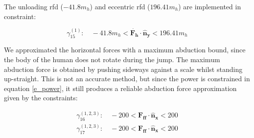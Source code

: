 \documentclass[default,iicol]{sn-jnl}
\begin{document}
{The unloading \gls{rfd} ($-41.8 m_h$) and eccentric \gls{rfd} ($196.41 m_h$) are implemented in constraint:

\begin{equation}
    \gamma_{15}^{(1)}: \quad  -41.8 m_h < \dot{\mathbf{F_h}} \cdot \mathbf{\hat n_y} < 196.41 m_h 
\end{equation}


We approximated the horizontal forces with a maximum abduction bound, since the body of the human does not rotate during the jump. The maximum abduction force is obtained by pushing sideways against a scale whilst standing up-straight. This is not an accurate method, but since the power is constrained in equation \ref{e_power}, it still produces a reliable abduction force approximation given by the constraints:

\begin{equation}
    \begin{array}{c}
         \gamma_{16}^{(1,2,3)}:\quad  -200 < \mathbf{F_{ff}}\cdot \mathbf{\hat n_x} < 200  \\
         \gamma_{17}^{(1,2,3)}: \quad -200 < \mathbf{F_{ff}}\cdot \mathbf{\hat n_x} < 200 \\ 
    \end{array}
\end{equation}

}
\end{document}
